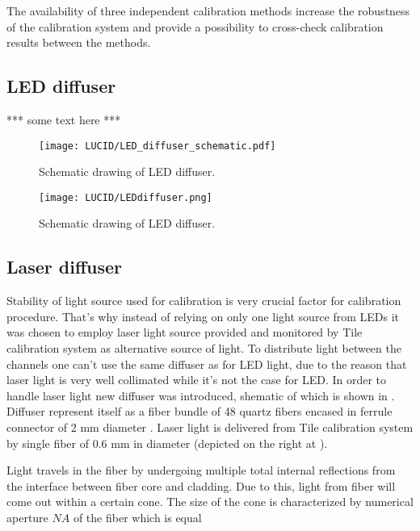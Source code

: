 The availability of three independent calibration methods increase the robustness of the calibration system 
and provide a possibility to cross-check calibration results between the methods.

\subsection{LED diffuser}
\label{subsec:LEDDiffuser}

*** some text here ***



\begin{figure}
\centering
\texttt{[image: LUCID/LED\_diffuser\_schematic.pdf]}
\caption{Schematic drawing of LED diffuser.}
\label{fig:LEDDiffuser}
\end{figure}

\begin{figure}
\centering
\texttt{[image: LUCID/LEDdiffuser.png]}
\caption{Schematic drawing of LED diffuser.}
\label{fig:LEDDiffuser}
\end{figure}


\subsection{Laser diffuser}
\label{subsec:laserDiffuser}


Stability of light source used for calibration is very crucial factor for calibration procedure.
That's why instead of relying on only one light source from LEDs it was chosen to employ laser light source 
provided and monitored by Tile calibration system \cite{atlasGeneral} as alternative source of light. 
To distribute light between the channels one can't use the same diffuser as for LED light, 
due to the reason that laser light is very well collimated while it's not the case for LED.
In order to handle laser light new diffuser was introduced, shematic of which is shown in .
Diffuser represent itself as a fiber bundle of 48 quartz fibers encased in ferrule connector of 2 mm diameter .
Laser light is delivered from Tile calibration system by single fiber of 0.6 mm in diameter (depicted on the right at ).

Light travels in the fiber by undergoing multiple total internal reflections from the interface between fiber core and cladding. 
Due to this, light from fiber will come out within a certain cone. The size of the cone is characterized by numerical aperture $NA$ of the fiber which is equal


